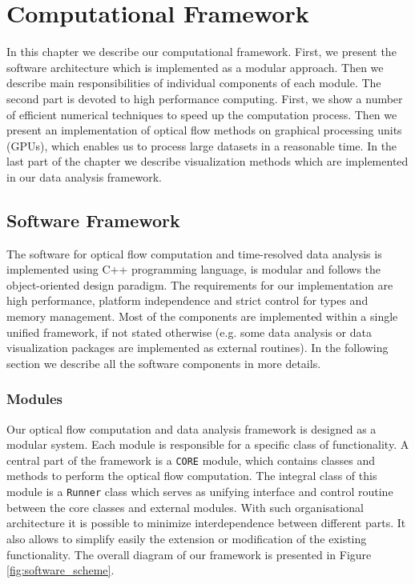 \chapter {Computational Framework}
\label{software}

In this chapter we describe our computational framework. First, we present the software architecture which is implemented as a modular approach. Then we describe main responsibilities of individual components of each module.
The second part is devoted to high performance computing. First, we show a number of efficient numerical techniques to speed up the computation process. Then we present an implementation of optical flow methods on graphical processing units (GPUs), which enables us to process large datasets in a reasonable time. In the last part of the chapter we describe visualization methods which are implemented in our data analysis framework.


\section {Software Framework}
\label{software_framework}

The software for optical flow computation and time-resolved data analysis is implemented using C++ programming language, is modular and follows the object-oriented design paradigm. The requirements for our implementation are high performance, platform independence and strict control for types and memory management.
Most of the components are implemented within a single unified framework, if not stated otherwise (e.g. some data analysis or data visualization packages are implemented as external routines). In the following section we describe all the software components in more details.


\subsection {Modules}

Our optical flow computation and data analysis framework is designed as a modular system. Each module is responsible for a specific class of functionality. A central part of the framework is a \texttt{CORE} module, which contains classes and methods to perform the optical flow computation. The integral class of this  module is a \texttt{Runner} class which serves as unifying interface and control routine between the core classes and external modules. 
With such organisational architecture it is possible to minimize interdependence between different parts. It also allows to simplify easily the extension or modification of the existing functionality.
The overall diagram of our framework is presented in Figure \ref{fig:software_scheme}.

